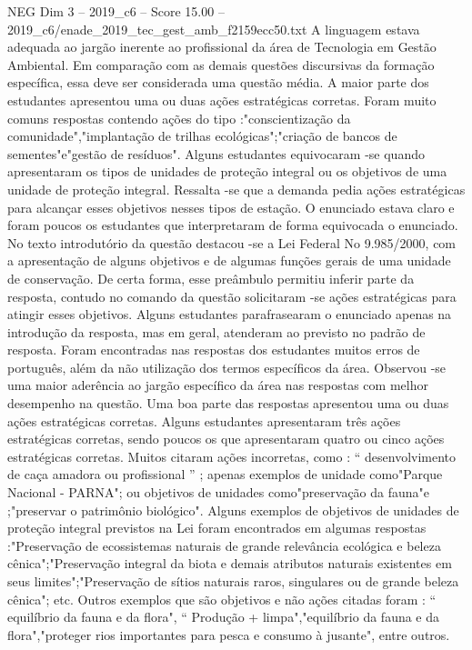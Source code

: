 \begin{textsample}{NEG Dim 3 – 2019\_c6 – Score 15.00 – 2019\_c6/enade\_2019\_tec\_gest\_amb\_f2159ecc50.txt}
A linguagem estava adequada ao jargão inerente ao profissional da área de Tecnologia em Gestão Ambiental.
Em comparação com as demais questões discursivas da formação específica, essa deve ser considerada uma questão média.
A maior parte dos estudantes apresentou uma ou duas ações estratégicas corretas.
Foram muito comuns respostas contendo ações do tipo :"conscientização da comunidade","implantação de trilhas ecológicas";"criação de bancos de sementes"e"gestão de resíduos".
Alguns estudantes equivocaram -se quando apresentaram os tipos de unidades de proteção integral ou os objetivos de uma unidade de proteção integral.
Ressalta -se que a demanda pedia ações estratégicas para alcançar esses objetivos nesses tipos de estação.
O enunciado estava claro e foram poucos os estudantes que interpretaram de forma equivocada o enunciado.
No texto introdutório da questão destacou -se a Lei Federal No 9.985/2000, com a apresentação de alguns objetivos e de algumas funções gerais de uma unidade de conservação.
De certa forma, esse preâmbulo permitiu inferir parte da resposta, contudo no comando da questão solicitaram -se ações estratégicas para atingir esses objetivos.
Alguns estudantes parafrasearam o enunciado apenas na introdução da resposta, mas em geral, atenderam ao previsto no padrão de resposta.
Foram encontradas nas respostas dos estudantes muitos erros de português, além da não utilização dos termos específicos da área.
Observou -se uma maior aderência ao jargão específico da área nas respostas com melhor desempenho na questão.
Uma boa parte das respostas apresentou uma ou duas ações estratégicas corretas.
Alguns estudantes apresentaram três ações estratégicas corretas, sendo poucos os que apresentaram quatro ou cinco ações estratégicas corretas.
Muitos citaram ações incorretas, como : “ desenvolvimento de caça amadora ou profissional ” ; apenas exemplos de unidade como"Parque Nacional - PARNA"; ou objetivos de unidades como"preservação da fauna"e ;"preservar o patrimônio biológico".
Alguns exemplos de objetivos de unidades de proteção integral previstos na Lei foram encontrados em algumas respostas :"Preservação de ecossistemas naturais de grande relevância ecológica e beleza cênica";"Preservação integral da biota e demais atributos naturais existentes em seus limites";"Preservação de sítios naturais raros, singulares ou de grande beleza cênica"; etc.
Outros exemplos que são objetivos e não ações citadas foram : “ equilíbrio da fauna e da flora", “ Produção + limpa","equilíbrio da fauna e da flora","proteger rios importantes para pesca e consumo à jusante", entre outros.

\end{textsample}
